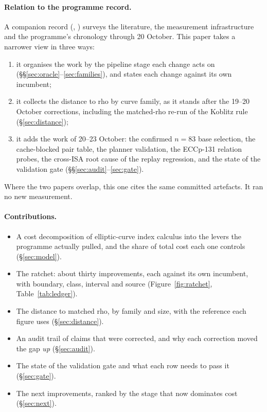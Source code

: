 \paragraph{Relation to the programme record.} A companion record
(\cite{icprogram2026}, ) surveys
the literature, the measurement infrastructure and the programme's
chronology through 20 October. This paper takes a narrower view in three
ways:
\begin{enumerate}
\item it organises the work by the pipeline stage each change acts on
  (\S\S\ref{sec:oracle}--\ref{sec:families}), and states each change
  against its own incumbent;
\item it collects the distance to rho by curve family, as it stands after
  the 19--20 October corrections, including the matched-rho re-run of the
  Koblitz rule (\S\ref{sec:distance});
\item it adds the work of 20--23 October: the confirmed $n=83$ base
  selection, the cache-blocked pair table, the planner validation, the
  ECCp-131 relation probes, the cross-ISA root cause of the replay
  regression, and the state of the validation gate
  (\S\S\ref{sec:audit}--\ref{sec:gate}).
\end{enumerate}
Where the two papers overlap, this one cites the same committed artefacts.
It ran no new measurement.

\paragraph{Contributions.}
\begin{itemize}
\item A cost decomposition of elliptic-curve index calculus into the levers
  the programme actually pulled, and the share of total cost each one
  controls (\S\ref{sec:model}).
\item The ratchet: about thirty improvements, each against its own
  incumbent, with boundary, class, interval and source
  (Figure~\ref{fig:ratchet}, Table~\ref{tab:ledger}).
\item The distance to matched rho, by family and size, with the reference
  each figure uses (\S\ref{sec:distance}).
\item An audit trail of claims that were corrected, and why each correction
  moved the gap \emph{up} (\S\ref{sec:audit}).
\item The state of the validation gate and what each row needs to pass it
  (\S\ref{sec:gate}).
\item The next improvements, ranked by the stage that now dominates cost
  (\S\ref{sec:next}).
\end{itemize}

